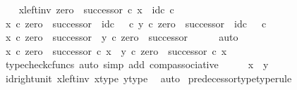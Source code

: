 \begin{isabellebody}
\ \ \isamarkupfalse%
\ x{\isacharunderscore}{\kern0pt}left{\isacharunderscore}{\kern0pt}inv{\isacharcolon}{\kern0pt}\ {\isachardoublequoteopen}zero\ {\isasymamalg}\ successor\ {\isasymcirc}\isactrlsub c\ x\ {\isacharequal}{\kern0pt}\ id\isactrlsub c\ {\isasymnat}\isactrlsub c{\isachardoublequoteclose}\isanewline
\ \ \isamarkupfalse%
\ {\isachardoublequoteopen}x\ {\isasymcirc}\isactrlsub c\ zero\ {\isasymamalg}\ successor\ {\isacharequal}{\kern0pt}\ id\isactrlsub c\ {\isacharparenleft}{\kern0pt}{\isasymone}\ {\isasymCoprod}\ {\isasymnat}\isactrlsub c{\isacharparenright}{\kern0pt}{\isachardoublequoteclose}\ {\isachardoublequoteopen}y\ {\isasymcirc}\isactrlsub c\ zero\ {\isasymamalg}\ successor\ {\isacharequal}{\kern0pt}\ id\isactrlsub c\ {\isacharparenleft}{\kern0pt}{\isasymone}\ {\isasymCoprod}\ {\isasymnat}\isactrlsub c{\isacharparenright}{\kern0pt}{\isachardoublequoteclose}\isanewline
\ \ \isamarkupfalse%
\ \isamarkupfalse%
\ {\isachardoublequoteopen}x\ {\isasymcirc}\isactrlsub c\ zero\ {\isasymamalg}\ successor\ {\isacharequal}{\kern0pt}\ y\ {\isasymcirc}\isactrlsub c\ zero\ {\isasymamalg}\ successor{\isachardoublequoteclose}\isanewline
\ \ \ \ \isamarkupfalse%
\ auto\isanewline
\ \ \isamarkupfalse%
\ \isamarkupfalse%
\ {\isachardoublequoteopen}x\ {\isasymcirc}\isactrlsub c\ zero\ {\isasymamalg}\ successor\ {\isasymcirc}\isactrlsub c\ x\ {\isacharequal}{\kern0pt}\ y\ {\isasymcirc}\isactrlsub c\ zero\ {\isasymamalg}\ successor\ {\isasymcirc}\isactrlsub c\ x{\isachardoublequoteclose}\isanewline
\ \ \ \ \isamarkupfalse%
\ {\isacharparenleft}{\kern0pt}typecheck{\isacharunderscore}{\kern0pt}cfuncs{\isacharcomma}{\kern0pt}\ auto\ simp\ add{\isacharcolon}{\kern0pt}\ comp{\isacharunderscore}{\kern0pt}associative{}{\isacharparenright}{\kern0pt}\isanewline
\ \ \isamarkupfalse%
\ \isamarkupfalse%
\ {\isachardoublequoteopen}x\ {\isacharequal}{\kern0pt}\ y{\isachardoublequoteclose}\isanewline
\ \ \ \ \isamarkupfalse%
\ id{\isacharunderscore}{\kern0pt}right{\isacharunderscore}{\kern0pt}unit{}\ x{\isacharunderscore}{\kern0pt}left{\isacharunderscore}{\kern0pt}inv\ x{\isacharunderscore}{\kern0pt}type\ y{\isacharunderscore}{\kern0pt}type\ \isamarkupfalse%
\ auto\isanewline
{}\isamarkupfalse%
%
\endisatagproof
{\isafoldproof}%
%
\isadelimproof
\isanewline
%
\endisadelimproof
\isanewline
{}\isamarkupfalse%
\ predecessor{\isacharprime}{\kern0pt}{\isacharunderscore}{\kern0pt}type{\isacharbrackleft}{\kern0pt}type{\isacharunderscore}{\kern0pt}rule{\isacharbrackright}{\kern0pt}{\isacharcolon}{\kern0pt}\isanewline

\end{isabellebody}
